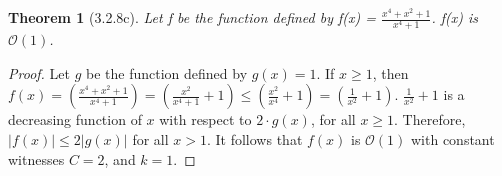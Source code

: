 \documentclass[a4paper, 12pt]{article}
\theoremstyle{plain}
\newtheorem*{theorem*}{Theorem}
\begin{document}
	
	\begin{theorem*}[3.2.8c]
		Let f be the function defined by f(x) = $\frac{x^{4} + x^{2} + 1}{x^{4} + 1}$. \newline f(x) is $\mathcal{O}(1)$.
	\end{theorem*}
	
	\begin{proof}
		Let $g$ be the function defined by $g(x) = 1$. If $x \ge 1$, then 
		\newline \newline \indent \indent
		$f(x) = \left( \frac{x^{4} + x^{2} + 1}{x^{4} + 1} \right) = \left( \frac{x^{2}}{x^{4}+1} + 1 \right) \le \left( \frac{x^{2}}{x^{4}} + 1 \right) = \left( \frac{1}{x^{2}} + 1 \right)$. \newline \newline $\frac{1}{x^{2}} + 1$ is a decreasing function of $x$ with respect to $2 \cdot g(x)$, for all $x \ge 1$. Therefore, $|f(x)| \le 2|g(x)|$ for all $x > 1$. It follows that $f(x)$ is $\mathcal{O}(1)$ with constant witnesses $C = 2$, and $k = 1$.
	\end{proof}
\end{document}

